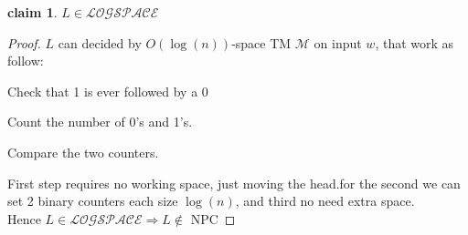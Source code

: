 \documentclass[12pt]{article}
\newtheorem*{claim*}{claim}
\begin{document}
\begin{enumerate}[label=(\alph*)]
\begin{claim*} $L\in\mathcal{LOGSPACE}$ 
\end{claim*}
\begin{proof}
$L$ can decided by $O(\log(n))$-space TM $\mathcal{M}$ on input $w$, that work as follow:
\begin{list}{•}{}
\item Check that 1 is ever followed by a 0
\item Count the number of 0’s and 1’s.
\item Compare the two counters.\end{list}
First step requires no working space, just moving the head.for the second we can set 2 binary counters each size $\log(n)$, and third no need extra space.
\\Hence $L\in\mathcal{LOGSPACE}\Rightarrow L \notin$ NPC\end{proof}


\end{enumerate}
\end{document}
